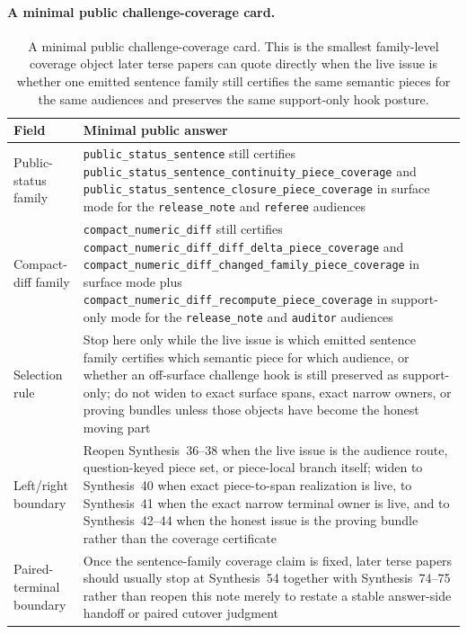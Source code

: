 \documentclass[11pt]{article}
\begin{document}
\paragraph{A minimal public challenge-coverage card.}
\begin{table}[t]
\centering
\small
\begin{tabularx}{\linewidth}{@{}lX@{}}
\toprule
Field & Minimal public answer \\
\midrule
Public-status family & \nolinkurl{public_status_sentence} still certifies \nolinkurl{public_status_sentence_continuity_piece_coverage} and \nolinkurl{public_status_sentence_closure_piece_coverage} in \textsf{surface} mode for the \nolinkurl{release_note} and \nolinkurl{referee} audiences \\
Compact-diff family & \nolinkurl{compact_numeric_diff} still certifies \nolinkurl{compact_numeric_diff_diff_delta_piece_coverage} and \nolinkurl{compact_numeric_diff_changed_family_piece_coverage} in \textsf{surface} mode plus \nolinkurl{compact_numeric_diff_recompute_piece_coverage} in \textsf{support-only} mode for the \nolinkurl{release_note} and \nolinkurl{auditor} audiences \\
Selection rule & Stop here only while the live issue is which emitted sentence family certifies which semantic piece for which audience, or whether an off-surface challenge hook is still preserved as \textsf{support-only}; do not widen to exact surface spans, exact narrow owners, or proving bundles unless those objects have become the honest moving part \\
Left/right boundary & Reopen Synthesis~36--38 when the live issue is the audience route, question-keyed piece set, or piece-local branch itself; widen to Synthesis~40 when exact piece-to-span realization is live, to Synthesis~41 when the exact narrow terminal owner is live, and to Synthesis~42--44 when the honest issue is the proving bundle rather than the coverage certificate \\
Paired-terminal boundary & Once the sentence-family coverage claim is fixed, later terse papers should usually stop at Synthesis~54 together with Synthesis~74--75 rather than reopen this note merely to restate a stable answer-side handoff or paired cutover judgment \\
\bottomrule
\end{tabularx}
\caption{A minimal public challenge-coverage card. This is the smallest family-level coverage object later terse papers can quote directly when the live issue is whether one emitted sentence family still certifies the same semantic pieces for the same audiences and preserves the same support-only hook posture.}
\label{tab:minimal-public-challenge-coverage-card}
\end{table}
\end{document}
